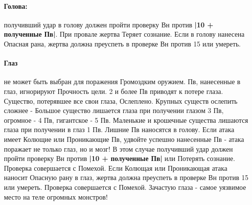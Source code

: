 \paragraph{Голова:} получивший удар в голову должен пройти проверку Вн против \textbf{|10 + полученные Пв|}. При провале жертва Теряет сознание. Если в голову нанесена Опасная рана, жертва должна преуспеть в проверке Вн против 15 или умереть.
\paragraph{Глаз} не может быть выбран для поражения Громоздким оружием. Пв, нанесенные в глаз, игнорируют Прочность цели. 2 и более Пв приводят к потере глаза. Существо, потерявшее все свои глаза, Ослеплено. Крупных существ ослепить сложнее - Большое существо лишается глаза при получении глазом 3 Пв, огромное - 4 Пв, гигантское - 5 Пв. Маленькие и крошечные существа лишаются глаза при получении в глаз 1 Пв. Лишние Пв наносятся в голову.
\newline
Если атака имеет Колющие или Проникающие Пв, удвойте успешно нанесенные Пв - атака поражает не только глаз, но и мозг! В этом случае получивший удар должен пройти проверку Вн против \textbf{|10 + полученные Пв|} или Потерять сознание. Проверка совершается с Помехой.
\newline
Если Колющая или Проникающая атака наносит Опасную рану в глаз, жертва должна преуспеть в проверке Вн против 15 или умереть. Проверка совершается с Помехой.
\newline
Зачастую глаза - самое уязвимое место на теле огромных монстров!